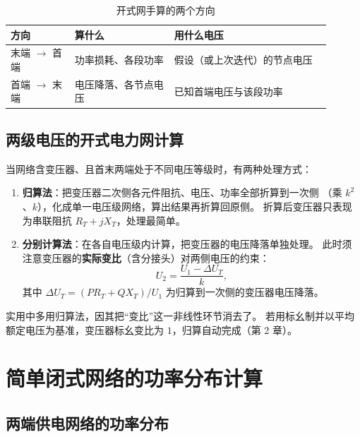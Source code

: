 \begin{table}[htbp]
  \centering
  \caption{开式网手算的两个方向}
  \small
  \begin{tabular}{@{}p{0.18\linewidth}p{0.28\linewidth}p{0.44\linewidth}@{}}
    \toprule
    方向 & 算什么 & 用什么电压 \\
    \midrule
    末端 $\to$ 首端 & 功率损耗、各段功率 & 假设（或上次迭代）的节点电压 \\
    首端 $\to$ 末端 & 电压降落、各节点电压 & 已知首端电压与该段功率 \\
    \bottomrule
  \end{tabular}
\end{table}


\subsection{两级电压的开式电力网计算}

当网络含变压器、且首末两端处于不同电压等级时，有两种处理方式：
\begin{enumerate}
  \item \textbf{归算法}：把变压器二次侧各元件阻抗、电压、功率全部折算到一次侧
        （乘 $k^{2}$、$k$），化成单一电压级网络，算出结果再折算回原侧。
        折算后变压器只表现为串联阻抗 $R_T+jX_T$，处理最简单。
  \item \textbf{分别计算法}：在各自电压级内计算，把变压器的电压降落单独处理。
        此时须注意变压器的\textbf{实际变比}（含分接头）对两侧电压的约束：
        \begin{equation}
          U_2=\frac{U_1-\Delta U_T}{k},
        \end{equation}
        其中 $\Delta U_T=\left(P R_T+Q X_T\right)/U_1$ 为归算到一次侧的变压器电压降落。
\end{enumerate}
实用中多用归算法，因其把“变比”这一非线性环节消去了。
若用标幺制并以平均额定电压为基准，变压器标幺变比为 $1$，归算自动完成（第 2 章）。

\section{简单闭式网络的功率分布计算}

\subsection{两端供电网络的功率分布}


